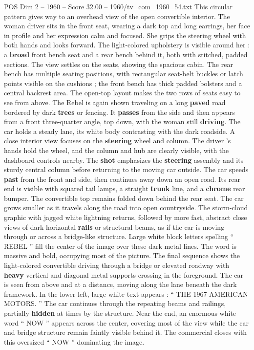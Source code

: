 \begin{textsample}{POS Dim 2 – 1960 – Score 32.00 – 1960/tv\_com\_1960\_54.txt}
This circular pattern gives way to an overhead view of the open convertible interior.
The woman driver sits in the front seat, wearing a dark top and long earrings, her face in profile and her expression calm and focused.
She grips the steering wheel with both hands and looks forward.
The light-colored upholstery is visible around her : a \textbf{broad} front bench seat and a rear bench behind it, both with stitched, padded sections.
The view settles on the seats, showing the spacious cabin.
The rear bench has multiple seating positions, with rectangular seat-belt buckles or latch points visible on the cushions ; the front bench has thick padded bolsters and a central backrest area.
The open-top layout makes the two rows of seats easy to see from above.
The Rebel is again shown traveling on a long \textbf{paved} road bordered by dark \textbf{trees} or fencing.
It \textbf{passes} from the side and then appears from a front three-quarter angle, top down, with the woman still \textbf{driving}.
The car holds a steady lane, its white body contrasting with the dark roadside.
A close interior view focuses on the \textbf{steering} wheel and column.
The driver ’s hands hold the wheel, and the column and hub are clearly visible, with the dashboard controls nearby.
The \textbf{shot} emphasizes the \textbf{steering} assembly and its sturdy central column before returning to the moving car outside.
The car speeds \textbf{past} from the front and side, then continues away down an open road.
Its rear end is visible with squared tail lamps, a straight \textbf{trunk} line, and a \textbf{chrome} rear bumper.
The convertible top remains folded down behind the rear seat.
The car grows smaller as it travels along the road into open countryside.
The storm-cloud graphic with jagged white lightning returns, followed by more fast, abstract close views of dark horizontal \textbf{rails} or structural beams, as if the car is moving through or across a bridge-like structure.
Large white block letters spelling “ REBEL ” fill the center of the image over these dark metal lines.
The word is massive and bold, occupying most of the picture.
The final sequence shows the light-colored convertible driving through a bridge or elevated roadway with \textbf{heavy} vertical and diagonal metal supports crossing in the foreground.
The car is seen from above and at a distance, moving along the lane beneath the dark framework.
In the lower left, large white text appears : “ THE 1967 AMERICAN MOTORS. ” The car continues through the repeating beams and railings, partially \textbf{hidden} at times by the structure.
Near the end, an enormous white word “ NOW ” appears across the center, covering most of the view while the car and bridge structure remain faintly visible behind it.
The commercial closes with this oversized “ NOW ” dominating the image.

\end{textsample}
